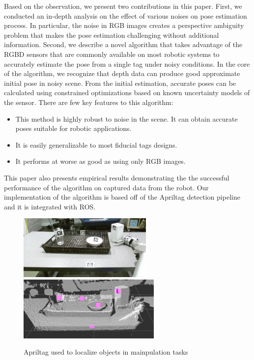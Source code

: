 Based on the observation, we present two contributions in this paper. First, we conducted an in-depth analysis on the effect of various noises on pose estimation process. In particular, the noise in RGB images creates a perspective ambiguity problem that makes the pose estimation challenging without additional information. Second, we describe a novel algorithm that takes advantage of the RGBD sensors that are commonly available on most robotic systems to accurately estimate the pose from a single tag under noisy conditions. In the core of the algorithm, we recognize that depth data can produce good approximate initial pose in noisy scene. From the initial estimation, accurate poses can be calculated using constrained optimizations based on known uncertainty models of the sensor. There are few key features to this algorithm: 
\begin{itemize}
\item This method is highly robust to noise in the scene. It can obtain accurate poses suitable for robotic applications.   
\item It is easily generalizable to most fiducial tags designs.
\item It performs at worse as good as using only RGB images.
\end{itemize}

This paper also presents empirical results demonstrating the the successful performance of the algorithm on captured data from the robot. Our implementation of the algorithm is based off of the Apriltag detection pipeline and it is integrated with ROS. 

\begin{figure}
\includegraphics[width=\columnwidth, height=120px]{figs/table_clearing_rgb_small} \\
\includegraphics[width=\columnwidth, height=120px]{figs/table_clearing_depth}
\label{fig:table_clearing}
\caption{Apriltag used to localize objects in mainpulation tasks}
\end{figure}